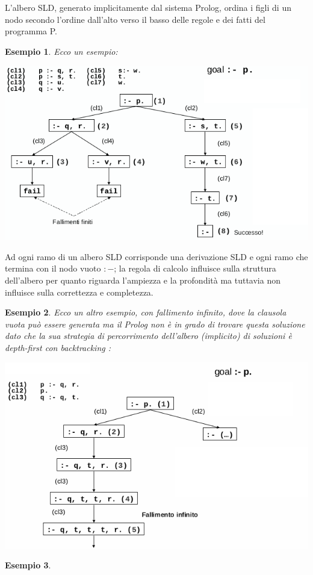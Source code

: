 \documentclass[a4paper]{report}
\newtheorem{esempio}{Esempio}
\begin{document}
\begin{itemize}
L'albero SLD, generato implicitamente dal sistema Prolog, ordina i figli di un nodo secondo l'ordine dall'alto verso il basso
delle regole e dei fatti del programma P. 
\begin{esempio}
Ecco un esempio:
\begin{center}
\includegraphics[scale=0.7]{img/alb.png}
\end{center}
\end{esempio}
Ad ogni ramo di un albero SLD corrisponde una derivazione SLD e ogni ramo che termina con il nodo vuoto $:-$; la regola di calcolo
influisce sulla struttura dell'albero per quanto riguarda l'ampiezza e la profondità ma tuttavia non influisce sulla correttezza e completezza.

\begin{esempio}
  Ecco un altro esempio, con fallimento infinito, dove la clausola vuota può essere generata ma il Prolog non è in grado di trovare
  questa soluzione dato che la sua strategia di percorrimento dell’albero (implicito) di soluzioni è depth-first con backtracking :
\begin{center}
\includegraphics[scale=0.7]{img/alb2.png}
\end{center}
\end{esempio}
\begin{esempio}
\end{esempio}

\end{itemize}
\end{document}
